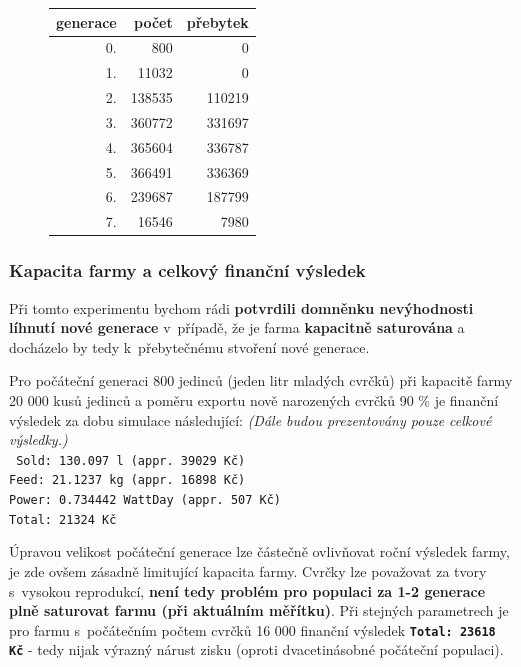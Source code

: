 \documentclass[11pt, a4paper, titlepage]{article}
\begin{document}
\begin{figure}[H]
\begin{minipage}{.5\textwidth}
\begin{center}
\begin{table}[H]
\begin{tabular}{|r|r|r|}
                        \hline
                        generace & počet & přebytek \\
                        \hline
                        0. & 800 & 0 \\
                        1. & 11032 & 0 \\
                        2. & 138535 & 110219 \\
                        3. & 360772 & 331697 \\
                        4. & 365604 & 336787 \\
                        5. & 366491 & 336369 \\
                        6. & 239687 & 187799 \\
                        7. & 16546 & 7980 \\
                        \hline
                    \end{tabular}
                \end{table}
            \end{center}
        \end{minipage}
    \end{figure}
    \vspace{-20pt}
    \subsubsection{Kapacita farmy a celkový finanční výsledek}
    Při tomto experimentu bychom rádi \textbf{potvrdili domněnku nevýhodnosti líhnutí nové generace} v~případě, že je farma
    \textbf{kapacitně saturována} a docházelo by tedy k~přebytečnému stvoření nové generace.

    Pro počáteční generaci 800 jedinců (jeden litr mladých cvrčků) při kapacitě farmy 20 000 kusů jedinců a poměru exportu nově narozených cvrčků 90 \%
    je finanční výsledek za dobu simulace následující: \textit{(Dále budou prezentovány pouze celkové výsledky.)} \\
    \texttt{
    Sold: 130.097 l (appr. 39029 Kč)\\
    Feed: 21.1237 kg (appr. 16898 Kč)\\
    Power: 0.734442 WattDay (appr. 507 Kč)\\
    Total: 21324 Kč\\
    }

    Úpravou velikost počáteční generace lze částečně ovlivňovat roční výsledek farmy, je zde ovšem zásadně limitující
    kapacita farmy. Cvrčky lze považovat za tvory s~vysokou reprodukcí, \textbf{není tedy problém pro populaci za 1-2
    generace plně saturovat farmu (při aktuálním měřítku)}. Při stejných parametrech je pro farmu s~počátečním počtem
    cvrčků 16 000 finanční výsledek \textbf{\texttt{Total: 23618 Kč}} - tedy nijak výrazný nárust zisku (oproti dvacetinásobné
    počáteční populaci).
\end{document}
